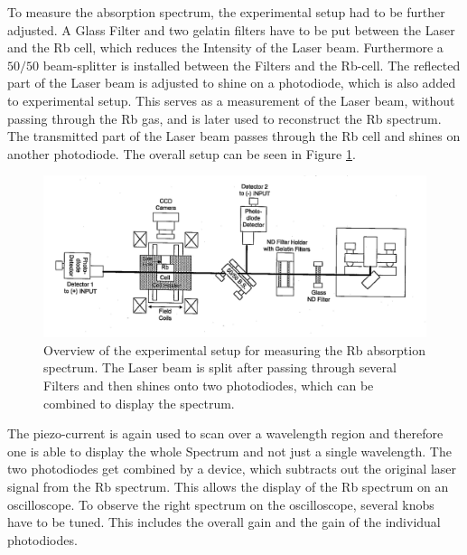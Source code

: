 To  measure the absorption spectrum, the experimental setup had to be further adjusted. A Glass Filter and two gelatin filters have to be put between the Laser and the Rb cell, which reduces the Intensity of the Laser beam. 
Furthermore a $50/50$ beam-splitter is installed between the Filters and the Rb-cell. The reflected part of the Laser beam is adjusted to shine on a photodiode, which is also added to experimental setup. This serves as a measurement of the Laser beam, without passing through the Rb gas, and is later used to reconstruct the Rb spectrum.
The transmitted part of the Laser beam passes through the Rb cell and shines on another photodiode. The overall setup can be seen in Figure \ref{fig:exp3}.
\begin{figure}
    \centering
    \includegraphics[width = \linewidth]{Bilder/exp3.png}
    \caption{ Overview of the experimental setup for measuring the Rb absorption spectrum. The Laser beam is split after passing through several Filters and then shines onto two photodiodes, which can be combined to display the spectrum.\cite{sample} }
    \label{fig:exp3}
\end{figure}
The piezo-current is again used to scan over a wavelength region and therefore one is able to display the whole Spectrum and not just a single wavelength.
The two photodiodes get combined by a device, which subtracts out the original laser signal from the Rb spectrum. This allows the display of the Rb spectrum on an oscilloscope. To observe the right spectrum on the oscilloscope, several knobs have to be tuned. This includes the overall gain and the gain of the individual photodiodes.

